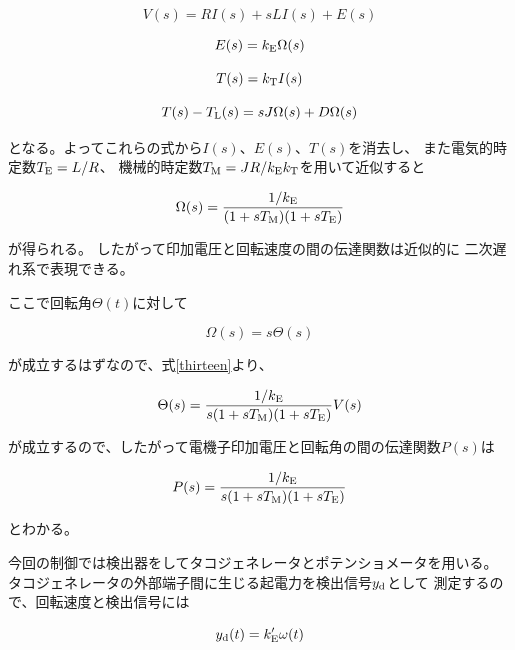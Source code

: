 \documentclass[uplatex, 11pt,a4j, titlepage]{jsarticle}
\begin{document}
\begin{equation}\label{five}
    V(s) = RI(s) + sLI(s) + E(s)
\end{equation}

\begin{equation}\label{six}
    E(s) = k_{\rm E} \Omega (s)
\end{equation}

\begin{equation}\label{seven}
    T(s) = k_{\rm T}I(s)    
\end{equation}

\begin{equation}\label{eight}
    T(s) - T_{\rm L}(s) = sJ\Omega(s) + D\Omega(s)
\end{equation}

となる。よってこれらの式から$I(s)$、$E(s)$、$T(s)$を消去し、
また電気的時定数$T_{\rm E} = L/R$、
機械的時定数$T_{\rm M}=JR/k_{\rm E}k_{\rm T}$を用いて近似すると

\begin{equation}\label{thirteen}
    \Omega(s)=\frac{1/k_{\rm E}}{(1+sT_{\rm M})(1+sT_{\rm E})}
\end{equation}

が得られる。
したがって印加電圧と回転速度の間の伝達関数は近似的に
二次遅れ系で表現できる。

ここで回転角$\Theta(t)$に対して

\begin{equation}\label{fifteen}
    \Omega(s) = s \Theta (s)
\end{equation}

が成立するはずなので、式\ref{thirteen}より、

\begin{equation}\label{sixteen}
    \Theta(s) = \frac{1/k_{\rm E}}{s(1+sT_{\rm M})(1+sT_{\rm E})}V(s)
\end{equation}

が成立するので、したがって電機子印加電圧と回転角の間の伝達関数$P(s)$は

\begin{equation}\label{seventeen}
    P(s) =\frac{1/k_{\rm E}}{s(1+sT_{\rm M})(1+sT_{\rm E})} 
\end{equation}

とわかる。

今回の制御では検出器をしてタコジェネレータとポテンショメータを用いる。
タコジェネレータの外部端子間に生じる起電力を検出信号$y_{\rm d}$として
測定するので、回転速度と検出信号には

\begin{equation}\label{eighteen}
    y_{\rm d}(t)=k'_{\rm E}\omega(t)
\end{equation}
\end{document}

